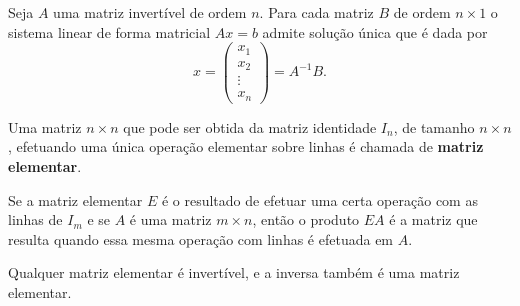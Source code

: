 \documentclass{beamer}
\begin{document}
    \begin{frame}
        \begin{teorema}
            Seja $A$ uma matriz invertível de ordem $n$. Para cada matriz $B$ de ordem $n\times 1$ o sistema linear de forma matricial
            $Ax = b$ admite solução única que é dada por
            \[
                x = \begin{pmatrix}
                    x_1 \\ x_2 \\ \vdots \\ x_n
                \end{pmatrix} = A^{-1}B.
            \]
        \end{teorema}
    \end{frame}

    \begin{frame}
        \begin{definicao}
            Uma matriz $n\times n$ que pode ser obtida da matriz identidade $I_n$, de tamanho $n\times n$, efetuando uma 
            única operação elementar sobre linhas é chamada de \textbf{matriz elementar}.
        \end{definicao}
    \end{frame}

    \begin{frame}
        \begin{teorema}
            Se a matriz elementar $E$ é o resultado de efetuar uma certa operação com as linhas de $I_m$ e se $A$ é uma matriz 
            $m \times n$, então o produto $EA$ é a matriz que resulta quando essa mesma operação com linhas é efetuada em $A$.
        \end{teorema}

        \vspace{1cm}

        \begin{teorema}
            Qualquer matriz elementar é invertível, e a inversa também é uma matriz elementar.
        \end{teorema}
    \end{frame}
\end{document}
